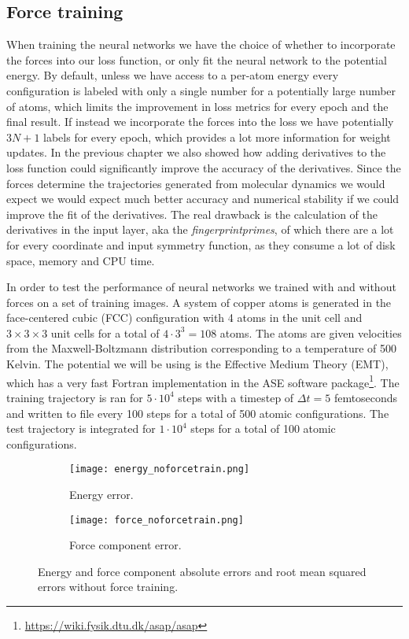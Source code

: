 \subsection{Force training}
When training the neural networks we have the choice of whether
to incorporate the forces into our loss function, or only fit
the neural network to the potential energy. By default, unless
we have access to a per-atom energy every configuration is labeled
with only a single number for a potentially large number of atoms,
which limits the improvement in loss metrics for every epoch
and the final result. If instead we incorporate the forces into the
loss we have potentially $3N + 1$ labels for every epoch,
which provides a lot more information for weight updates.
In the previous chapter we also showed how adding derivatives to
the loss function could significantly improve the accuracy of the
derivatives. Since the forces determine the trajectories generated
from molecular dynamics we would expect we would expect much better
accuracy and numerical stability if we could improve the fit of
the derivatives.
The real drawback is the calculation of the derivatives in the input layer,
aka the \textit{fingerprintprimes}, of which there are a lot for every coordinate
and input symmetry function, as they consume a lot of disk space, memory and CPU time.
\par
In order to test the performance of neural networks
we trained with and without forces on a set of training images.
A system of copper atoms is generated in the face-centered cubic (FCC)
configuration with 4 atoms in the unit cell and $3 \times 3 \times 3$
unit cells for a total of $4 \cdot 3^3 = 108$ atoms. The
atoms are given velocities from the Maxwell-Boltzmann distribution
corresponding to a temperature of 500 Kelvin. The potential we will
be using is the Effective Medium Theory (EMT), which has a very
fast Fortran implementation in the ASE software package\footnote{
\url{https://wiki.fysik.dtu.dk/asap/asap}}.
The training trajectory is ran for $5 \cdot 10^4$ steps with
a timestep of $\Delta t = 5$ femtoseconds and written to file every 100 steps
for a total of 500 atomic configurations. The test trajectory is
integrated for $1 \cdot 10^4$ steps for a total of 100 atomic configurations.

\begin{figure}[H]
\begin{adjustbox}{max width=1.2\linewidth,center}
\centering
  \begin{subfigure}[b]{0.55\textwidth}
      \texttt{[image: energy\_noforcetrain.png]}
      \caption{Energy error.}
    \label{fig:f1}
  \end{subfigure}
  \hfill
  \begin{subfigure}[b]{0.55\textwidth}
      \texttt{[image: force\_noforcetrain.png]}
      \caption{Force component error.}
    \label{fig:f2}
  \end{subfigure}
\end{adjustbox}
\caption{Energy and force component absolute errors and root mean
    squared errors without force training.}
    \label{fig:noforcetrain}
\end{figure}

